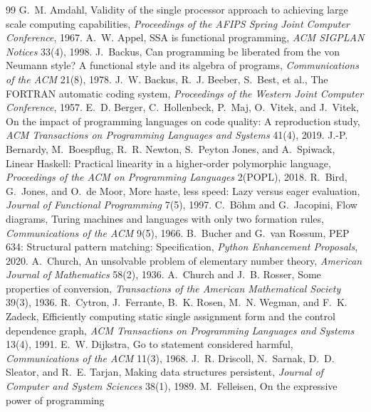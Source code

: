 \documentclass[11pt]{article}
\theoremstyle{definition}
\theoremstyle{remark}
\begin{document}
\newpage %
\begin{thebibliography}{99}
   G.~M. Amdahl, Validity of the single processor approach
  to achieving large scale computing capabilities, \emph{Proceedings of the
  AFIPS Spring Joint Computer Conference}, 1967.
   A.~W. Appel, SSA is functional programming, \emph{ACM
  SIGPLAN Notices} 33(4), 1998.
   J.~Backus, Can programming be liberated from the von
  Neumann style? A functional style and its algebra of programs,
  \emph{Communications of the ACM} 21(8), 1978.
   J.~W. Backus, R.~J. Beeber, S.~Best, et al., The
  FORTRAN automatic coding system, \emph{Proceedings of the Western Joint
  Computer Conference}, 1957.
   E.~D. Berger, C.~Hollenbeck, P.~Maj, O.~Vitek, and
  J.~Vitek, On the impact of programming languages on code quality: A
  reproduction study, \emph{ACM Transactions on Programming Languages and
  Systems} 41(4), 2019.
   J.-P. Bernardy, M.~Boespflug, R.~R. Newton,
  S.~Peyton Jones, and A.~Spiwack, Linear Haskell: Practical linearity in a
  higher-order polymorphic language, \emph{Proceedings of the ACM on
  Programming Languages} 2(POPL), 2018.
   R.~Bird, G.~Jones, and O.~de Moor, More haste, less speed:
  Lazy versus eager evaluation, \emph{Journal of Functional Programming}
  7(5), 1997.
   C.~B\"ohm and G.~Jacopini, Flow diagrams, Turing machines
  and languages with only two formation rules, \emph{Communications of the
  ACM} 9(5), 1966.
   B.~Bucher and G.~van Rossum, PEP 634: Structural pattern
  matching: Specification, \emph{Python Enhancement Proposals}, 2020.
   A.~Church, An unsolvable problem of elementary number
  theory, \emph{American Journal of Mathematics} 58(2), 1936.
   A.~Church and J.~B. Rosser, Some properties of
  conversion, \emph{Transactions of the American Mathematical Society}
  39(3), 1936.
   R.~Cytron, J.~Ferrante, B.~K. Rosen, M.~N. Wegman, and
  F.~K. Zadeck, Efficiently computing static single assignment form and the
  control dependence graph, \emph{ACM Transactions on Programming Languages
  and Systems} 13(4), 1991.
   E.~W. Dijkstra, Go to statement considered harmful,
  \emph{Communications of the ACM} 11(3), 1968.
   J.~R. Driscoll, N.~Sarnak, D.~D. Sleator, and
  R.~E. Tarjan, Making data structures persistent, \emph{Journal of
  Computer and System Sciences} 38(1), 1989.
   M.~Felleisen, On the expressive power of programming

\end{thebibliography}
\end{document}
